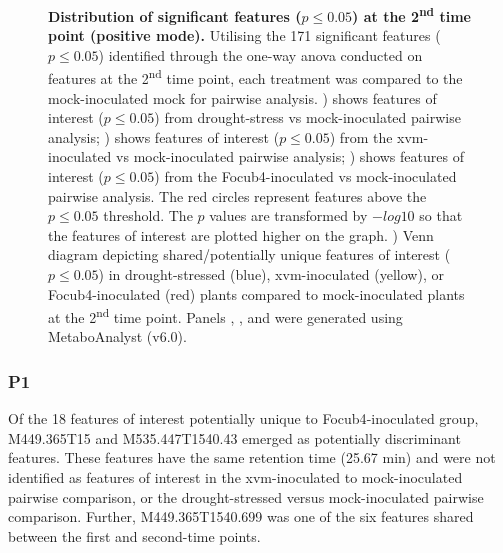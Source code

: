 \begin{figure}[hp!]
\begin{subfigure}[b]{0.47\textwidth}
    \caption{}
    \label{fig:PairwiseVenn-SecondTimePoint}
  \end{subfigure}
  \caption[Distribution of significant features at the 2\textsuperscript{nd} time point (positive mode).]{\textbf{Distribution of significant features ($p \le0.05$) at the 2\textsuperscript{nd} time point (positive mode).}
  Utilising the 171 significant features ($p \le0.05$) identified through the one-way \ac{anova} conducted on features at the 2\textsuperscript{nd} time point, each treatment was compared to the mock-inoculated mock for pairwise analysis.
  \textbf{}) shows features of interest ($p \le0.05$) from drought-stress vs mock-inoculated pairwise analysis;
  \textbf{}) shows features of interest ($p \le0.05$) from the \acl{xvm}-inoculated vs mock-inoculated pairwise analysis; 
  \textbf{}) shows features of interest ($p \le0.05$) from the \acl{Focub4}-inoculated vs mock-inoculated pairwise analysis. The red circles represent features above the $p \le0.05$ threshold. The $p$ values are transformed by $-log10$ so that the features of interest are plotted higher on the graph.
  \textbf{}) Venn diagram depicting shared/potentially unique features of interest ($p \le0.05$) in drought-stressed (blue), \ac{xvm}-inoculated (yellow), or \ac{Focub4}-inoculated (red) plants compared to mock-inoculated plants at the 2\textsuperscript{nd} time point. 
  Panels , , and  were generated using MetaboAnalyst (v6.0). 
  }
  \label{fig:enter-label}
\end{figure}

\subsubsection{P1}

Of the 18 features of interest potentially unique to \ac{Focub4}-inoculated group, M449.365T15 and M535.447T1540.43 emerged as potentially discriminant features. These features have the same retention time (25.67 min) and were not identified as features of interest in the \ac{xvm}-inoculated to mock-inoculated pairwise comparison, or the drought-stressed versus mock-inoculated pairwise comparison. Further, M449.365T1540.699 was one of the six features shared between the first and second-time points. 

